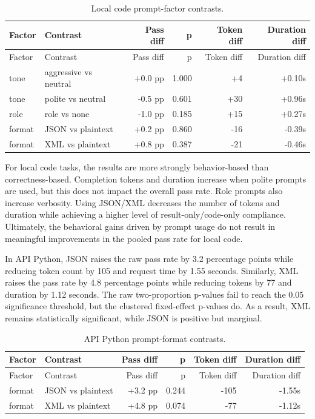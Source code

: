 \documentclass{llncs}
\begin{document}
\begin{longtable}[]{@{}llrrrr@{}}
\caption{Local code prompt-factor contrasts.}\tabularnewline
\toprule\noalign{}
Factor & Contrast & Pass diff & p & Token diff & Duration diff \\
\midrule\noalign{}
\endfirsthead
\toprule\noalign{}
Factor & Contrast & Pass diff & p & Token diff & Duration diff \\
\midrule\noalign{}
\endhead
\bottomrule\noalign{}
\endlastfoot
tone & aggressive vs neutral & +0.0 pp & 1.000 & +4 & +0.10s \\
tone & polite vs neutral & -0.5 pp & 0.601 & +30 & +0.96s \\
role & role vs none & -1.0 pp & 0.185 & +15 & +0.27s \\
format & JSON vs plaintext & +0.2 pp & 0.860 & -16 & -0.39s \\
format & XML vs plaintext & +0.8 pp & 0.387 & -21 & -0.46s \\
\end{longtable}

For local code tasks, the results are more strongly behavior-based than correctness-based. Completion tokens and duration increase when polite prompts are used, but this does not impact the overall pass rate. Role prompts also increase verbosity. Using JSON/XML decreases the number of tokens and duration while achieving a higher level of result-only/code-only compliance. Ultimately, the behavioral gains driven by prompt usage do not result in meaningful improvements in the pooled pass rate for local code.

In API Python, JSON raises the raw pass rate by 3.2 percentage points while reducing token count by 105 and request time by 1.55 seconds. Similarly, XML raises the pass rate by 4.8 percentage points while reducing tokens by 77 and duration by 1.12 seconds. The raw two-proportion p-values fail to reach the 0.05 significance threshold, but the clustered fixed-effect p-values do. As a result, XML remains statistically significant, while JSON is positive but marginal.

\begin{longtable}[]{@{}llrrrr@{}}
\caption{API Python prompt-format contrasts.}\tabularnewline
\toprule\noalign{}
Factor & Contrast & Pass diff & p & Token diff & Duration diff \\
\midrule\noalign{}
\endfirsthead
\toprule\noalign{}
Factor & Contrast & Pass diff & p & Token diff & Duration diff \\
\midrule\noalign{}
\endhead
\bottomrule\noalign{}
\endlastfoot
format & JSON vs plaintext & +3.2 pp & 0.244 & -105 & -1.55s \\
format & XML vs plaintext & +4.8 pp & 0.074 & -77 & -1.12s \\
\end{longtable}
\end{document}
